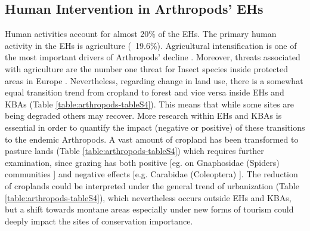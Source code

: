     \subsection{Human Intervention in Arthropods’ EHs}
    \label{subsec:arthropods-human-intervention-ehs}
Human activities account for almost 20\% of the EHs. The primary human activity
in the EHs is agriculture (~19.6\%). Agricultural intensification is one of the
most important drivers of Arthropods’ decline \parencite{bruhl2019biodiversity,habel2019agricultural,raven2021agricultural}.
Moreover, threats associated with agriculture are the number one threat for
Insect species inside protected areas in Europe \parencite{chowdhury2023protected}.
Nevertheless, regarding change in land use, there is a somewhat equal
transition trend from cropland to forest and vice versa inside EHs and KBAs
(Table \ref{table:arthropods-tableS4}). This means that while some sites are being
degraded others may recover. More research within EHs and KBAs is essential in
order to quantify the impact (negative or positive) of these transitions to the
endemic Arthropods. A vast amount of cropland has been transformed to pasture
lands (Table \ref{table:arthropods-tableS4}) which requires further examination,
since grazing has both positive [eg. on Gnaphosidae (Spiders) communities \parencite{kaltsas2019overgrazed}]
and negative effects [e.g. Carabidae (Coleoptera) \parencite{kaltsas2013ground}].
The reduction of croplands could be interpreted under the general trend of
urbanization (Table \ref{table:arthropods-tableS4}), which nevertheless occurs
outside EHs and KBAs, but a shift towards montane areas especially under new
forms of tourism could deeply impact the sites of conservation importance.


